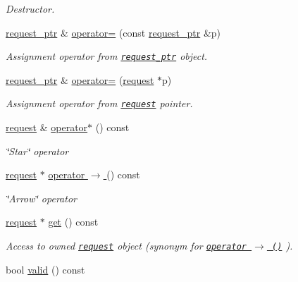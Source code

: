 \begin{CompactItemize}
\begin{CompactList}\small\item\em Destructor. \item\end{CompactList}\item 
\hyperlink{classrequest__ptr}{request\_\-ptr} \& \hyperlink{group__iolayer_g1f361f479f69ffb179ec4b54615aa1b5}{operator=} (const \hyperlink{classrequest__ptr}{request\_\-ptr} \&p)
\begin{CompactList}\small\item\em Assignment operator from {\tt \hyperlink{classrequest__ptr}{request\_\-ptr}} object. \item\end{CompactList}\item 
\hyperlink{classrequest__ptr}{request\_\-ptr} \& \hyperlink{group__iolayer_gfef634a7f244626b88ccfb71f93060e8}{operator=} (\hyperlink{classrequest}{request} $\ast$p)
\begin{CompactList}\small\item\em Assignment operator from {\tt \hyperlink{classrequest}{request}} pointer. \item\end{CompactList}\item 
\hyperlink{classrequest}{request} \& \hyperlink{group__iolayer_g15bd551f80acd18f2d0e3a1aade2b40c}{operator$\ast$} () const 
\begin{CompactList}\small\item\em \char`\"{}Star\char`\"{} operator \item\end{CompactList}\item 
\hyperlink{classrequest}{request} $\ast$ \hyperlink{group__iolayer_g9ccc7167eaa30948950571a094b9c902}{operator $\rightarrow$ } () const 
\begin{CompactList}\small\item\em \char`\"{}Arrow\char`\"{} operator \item\end{CompactList}\item 
\hyperlink{classrequest}{request} $\ast$ \hyperlink{group__iolayer_g30490f3d014bae40a66022640fb34153}{get} () const 
\begin{CompactList}\small\item\em Access to owned {\tt \hyperlink{classrequest}{request}} object (synonym for {\tt \hyperlink{group__iolayer_g9ccc7167eaa30948950571a094b9c902}{operator $\rightarrow$ ()}} ). \item\end{CompactList}\item 
\hypertarget{group__iolayer_g848a2fc2a409c2d22bd8a91dd22aebba}{
bool \hyperlink{group__iolayer_g848a2fc2a409c2d22bd8a91dd22aebba}{valid} () const }
\label{group__iolayer_g848a2fc2a409c2d22bd8a91dd22aebba}


\end{CompactItemize}
